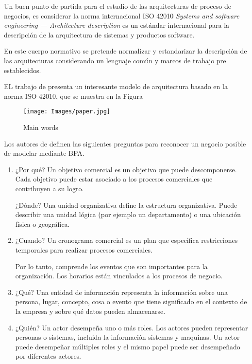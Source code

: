 \documentclass{article}
\begin{document}
Un buen punto de partida para el estudio de las arquitecturas de proceso de negocios, es considerar la norma internacional ISO 42010 \textit{Systems and software engineering — Architecture description} es un estándar internacional para la descripción de la arquitectura de sistemas y productos software.

En este cuerpo normativo se pretende normalizar y estandarizar la descripción de las arquitecturas considerando un lenguaje común y marcos de trabajo pre establecidos.

EL trabajo de \cite{art2:a2} presenta un interesante modelo de arquitectura basado en la norma ISO 42010, que se muestra en la Figura

\begin{figure}[H]
\texttt{[image: Images/paper.jpg]}
\centering
\caption{Main words \cite{art2:a2}}
\label{mundo}
\end{figure}


Los autores de \cite{art2:a2} definen las siguientes preguntas para reconocer un negocio posible de modelar mediante BPA.

\begin{enumerate}

\item¿Por qué? Un objetivo comercial es un objetivo que puede descomponerse. Cada objetivo puede estar asociado a los procesos comerciales que contribuyen a su logro. 

¿Dónde? Una unidad organizativa define la estructura organizativa. Puede describir una unidad lógica (por ejemplo un departamento) o una ubicación física o geográfica.

\item¿Cuando? Un cronograma comercial es un plan que especifica restricciones temporales para realizar procesos comerciales.

Por lo tanto, comprende los eventos que son importantes para la organización. Los horarios están vinculados a los procesos de negocio.

\item¿Qué? Una entidad de información representa la información sobre una persona, lugar, concepto, cosa o evento que tiene significado en el contexto de la empresa y sobre qué datos pueden almacenarse.

\item¿Quién? Un actor desempeña uno o más roles. Los actores pueden representar personas o sistemas, incluida la información sistemas y maquinas. Un actor puede desempeñar múltiples roles y el mismo papel puede ser desempeñado por diferentes actores.
 \end{enumerate}
\end{document}
